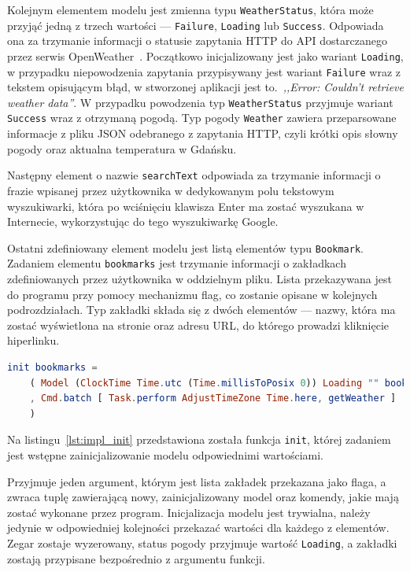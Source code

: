 \documentclass[twoside,a4paper]{report}
\begin{document}
Kolejnym elementem modelu jest zmienna typu \texttt{WeatherStatus}, która może przyjąć jedną z trzech wartości --- \texttt{Failure}, \texttt{Loading} lub \texttt{Success}.
Odpowiada ona za trzymanie informacji o statusie zapytania HTTP do API dostarczanego przez serwis OpenWeather~\cite{openweather}.
Początkowo inicjalizowany jest jako wariant \texttt{Loading}, w przypadku niepowodzenia zapytania przypisywany jest wariant \texttt{Failure} wraz z tekstem opisującym błąd, w stworzonej aplikacji jest to.~\textit{,,Error: Couldn't retrieve weather data''}.
W przypadku powodzenia typ \texttt{WeatherStatus} przyjmuje wariant \texttt{Success} wraz z otrzymaną pogodą.
Typ pogody \texttt{Weather} zawiera przeparsowane informacje z pliku JSON odebranego z zapytania HTTP, czyli krótki opis słowny pogody oraz aktualna temperatura w Gdańsku.

Następny element o nazwie \texttt{searchText} odpowiada za trzymanie informacji o frazie wpisanej przez użytkownika w dedykowanym polu tekstowym wyszukiwarki, która po wciśnięciu klawisza Enter ma zostać wyszukana w Internecie, wykorzystując do tego wyszukiwarkę Google.

Ostatni zdefiniowany element modelu jest listą elementów typu \texttt{Bookmark}.
Zadaniem elementu \texttt{bookmarks} jest trzymanie informacji o zakładkach zdefiniowanych przez użytkownika w oddzielnym pliku.
Lista przekazywana jest do programu przy pomocy mechanizmu flag, co zostanie opisane w kolejnych podrozdziałach.
Typ zakładki składa się z dwóch elementów --- nazwy, która ma zostać wyświetlona na stronie oraz adresu URL, do którego prowadzi kliknięcie hiperlinku.

\begin{lstlisting}[caption={Funkcja inicjalizująca model},label={lst:impl_init},language={Elm}]
init bookmarks =
    ( Model (ClockTime Time.utc (Time.millisToPosix 0)) Loading "" bookmarks
    , Cmd.batch [ Task.perform AdjustTimeZone Time.here, getWeather ]
    )
\end{lstlisting}

Na listingu~\ref{lst:impl_init} przedstawiona została funkcja \texttt{init}, której zadaniem jest wstępne zainicjalizowanie modelu odpowiednimi wartościami.

Przyjmuje jeden argument, którym jest lista zakładek przekazana jako flaga, a zwraca tuplę zawierającą nowy, zainicjalizowany model oraz komendy, jakie mają zostać wykonane przez program.
Inicjalizacja modelu jest trywialna, należy jedynie w odpowiedniej kolejności przekazać wartości dla każdego z elementów. Zegar zostaje wyzerowany, status pogody przyjmuje wartość \texttt{Loading}, a zakładki zostają przypisane bezpośrednio z argumentu funkcji.
\end{document}
